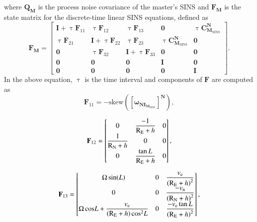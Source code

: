 \documentclass[3p]{elsarticle}
\begin{document}
where \(\mathbf{Q}_{\mathbf{M}}\) is the process noise covariance of the master's SINS and \(\mathbf{F}_{\mathbf{M}}\) is the state matrix for the discrete-time linear SINS equations, defined as
\begin{equation}
	\mathbf{F}_{\mathbf{M}} = \begin{bmatrix}
		\mathbf{I} + \uptau\mathbf{F}_{11} & \uptau \mathbf{F}_{12} & \uptau \mathbf{F}_{13} & \mathbf{0} & \uptau \mathbf{C}_{\mathbf{M}_{\text{SINS}}}^{\mathbf{N}} \\
		\uptau \mathbf{F}_{21} & \mathbf{I} + \uptau\mathbf{F}_{22} & \uptau \mathbf{F}_{23} & \uptau \mathbf{C}_{\mathbf{M}_{\text{SINS}}}^{\mathbf{N}} & \mathbf{0} \\
		\mathbf{0} & \uptau \mathbf{F}_{32} & \mathbf{I} + \uptau\mathbf{F}_{33} & \mathbf{0} & \mathbf{0} \\
		\mathbf{0} & \mathbf{0} & \mathbf{0} & \mathbf{I} & \mathbf{0} \\
		\mathbf{0} & \mathbf{0} & \mathbf{0} & \mathbf{0} & \mathbf{I}
	\end{bmatrix}.
	\label{eq:F_matrix}
\end{equation}
In the above equation,
 \(\uptau\) is the time interval
and components of \(\mathbf{F}\) are computed as
\begin{equation}\label{F11}
{{\mathbf{F}}_{11}} =  -
\textrm{skew}\!
\left(
{\left[{\boldsymbol{\omega }}_{{\mathbf{NI}_{\mathbf{M}_{\textrm{SINS}}}}}\right]}^{\mathbf{N}}
\right),
\end{equation}

\begin{equation}\label{F12}
	{{\mathbf{F}}_{12}} = \begin{bmatrix}
		0 & \dfrac{{ - 1}}{{{{\rm{R}}_{\rm{E}}} +  h}} & 0 \\
		\dfrac{1}{{{{\rm{R}}_{\rm{N}}} + h}} & 0 & 0 \\
		0 & \dfrac{{\tan  L}}{{{{\rm{R}}_{\rm{E}}} + h}} & 0
	\end{bmatrix},
\end{equation}


\begin{equation}\label{F13}
	{{\mathbf{F}}_{13}} = \begin{bmatrix}
		{\rm{\Omega} \sin}(L) & 0 & \dfrac{{{{ v}_{\rm{e}}}}}{{{{\left( {{{\rm{R}}_{\rm{E}}} +  h} \right)}^2}}} \\
		0 & 0 & \dfrac{{ - {{ v}_{\rm{n}}}}}{{{{\left( {{{\rm{R}}_{\rm{N}}} +  h} \right)}^2}}} \\
		{\rm{\Omega \cos}} L + \dfrac{{{{ v}_{\rm{e}}}}}{{\left( {{{\rm{R}}_{\rm{E}}} +  h} \right){\rm{co}}{{\rm{s}}^2} L}} & 0 & \dfrac{{ - {{ v}_{\rm{e}}}\tan  L}}{{{{\left( {{{\rm{R}}_{\rm{E}}} +  h} \right)}^2}}}
	\end{bmatrix},
\end{equation}
\end{document}
